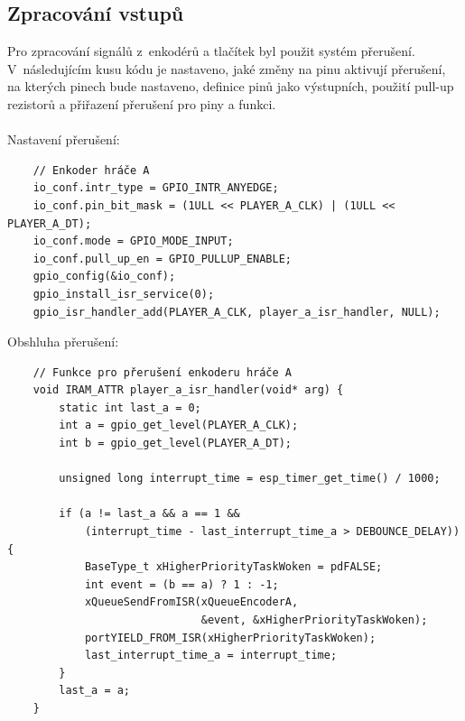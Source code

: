 \documentclass[a4paper,11pt]{article}
\begin{document}
\subsection{Zpracování vstupů}
Pro zpracování signálů z~enkodérů a tlačítek byl použit systém přerušení.
V~následujícím kusu kódu je nastaveno, jaké změny na pinu aktivují přerušení, na kterých pinech bude nastaveno, definice pinů jako výstupních, použití pull-up rezistorů a přiřazení přerušení pro piny a funkci. 
\\ \\ \noindent
Nastavení přerušení:
\begin{verbatim}
    // Enkoder hráče A
    io_conf.intr_type = GPIO_INTR_ANYEDGE;
    io_conf.pin_bit_mask = (1ULL << PLAYER_A_CLK) | (1ULL << PLAYER_A_DT);
    io_conf.mode = GPIO_MODE_INPUT;
    io_conf.pull_up_en = GPIO_PULLUP_ENABLE;
    gpio_config(&io_conf);
    gpio_install_isr_service(0);
    gpio_isr_handler_add(PLAYER_A_CLK, player_a_isr_handler, NULL);
\end{verbatim}
\noindent
Obshluha přerušení:
\begin{verbatim}
    // Funkce pro přerušení enkoderu hráče A
    void IRAM_ATTR player_a_isr_handler(void* arg) {
        static int last_a = 0;
        int a = gpio_get_level(PLAYER_A_CLK);
        int b = gpio_get_level(PLAYER_A_DT);

        unsigned long interrupt_time = esp_timer_get_time() / 1000;

        if (a != last_a && a == 1 && 
            (interrupt_time - last_interrupt_time_a > DEBOUNCE_DELAY)) {
            BaseType_t xHigherPriorityTaskWoken = pdFALSE;
            int event = (b == a) ? 1 : -1; 
            xQueueSendFromISR(xQueueEncoderA,
                              &event, &xHigherPriorityTaskWoken);
            portYIELD_FROM_ISR(xHigherPriorityTaskWoken);
            last_interrupt_time_a = interrupt_time; 
        }
        last_a = a;
    }
\end{verbatim}
\end{document}
